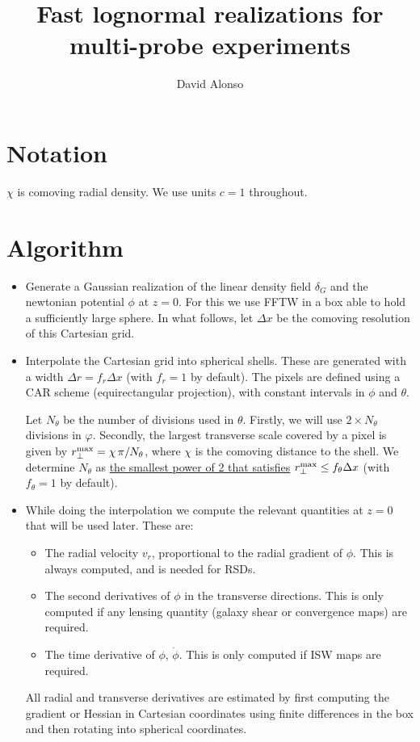 \documentclass[a4paper,10pt]{article}
\title{Fast lognormal realizations for multi-probe experiments}
\author{David Alonso}
\begin{document}
\maketitle

\section{Notation}
$\chi$ is comoving radial density. We use units $c=1$ throughout.

\section{Algorithm}
  \begin{itemize}
    \item Generate a Gaussian realization of the linear density field
      $\delta_G$ and the newtonian potential $\phi$ at $z=0$. For
      this we use FFTW in a box able to hold a sufficiently large
      sphere. In what follows, let $\Delta x$ be the comoving resolution 
      of this Cartesian grid.
    \item Interpolate the Cartesian grid into spherical shells. These
      are generated with a width $\Delta r=f_r\Delta x$ (with $f_r=1$
      by default). The pixels are defined using a CAR scheme
      (equirectangular projection), with constant intervals in $\phi$
      and $\theta$.

      Let $N_\theta$ be the number of divisions used in $\theta$. Firstly,
      we will use $2\times N_\theta$ divisions in $\varphi$. Secondly,
      the largest transverse scale covered by a pixel is given by
      $r_\perp^{\rm max}=\chi\,\pi/N_\theta$, where $\chi$ is the comoving
      distance to the shell. We determine $N_\theta$ as \underline{the smallest power
        of 2 that satisfies} $r_\perp^{\rm max}\leq f_\theta\Delta x$
      (with $f_\theta=1$ by default).
    \item While doing the interpolation we compute the relevant
      quantities at $z=0$ that will be used later. These are:
      \begin{itemize}
        \item The radial velocity $v_r$, proportional to the radial
          gradient of $\phi$. This is always computed, and is needed
          for RSDs.
        \item The second derivatives of $\phi$ in the transverse directions.
          This is only computed if any lensing quantity (galaxy shear or
          convergence maps) are required.
        \item The time derivative of $\phi$, $\dot{\phi}$. This is only
          computed if ISW maps are required.
      \end{itemize}
      All radial and transverse derivatives are estimated by first computing
      the gradient or Hessian in Cartesian coordinates using finite differences
      in the box and then rotating into spherical coordinates.
      

\end{itemize}
\end{document}
